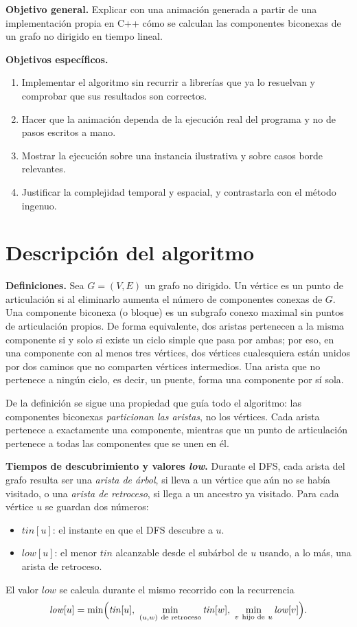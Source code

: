 \documentclass[11pt,a4paper]{article}
\numberwithin{equation}{section}
\newcommand{\tin}{\mathit{tin}}
\newcommand{\low}{\mathit{low}}
\begin{document}
\textbf{Objetivo general.} Explicar con una animación generada a partir de una implementación propia en C++ cómo se calculan las componentes biconexas de un grafo no dirigido en tiempo lineal.

\textbf{Objetivos específicos.}
\begin{enumerate}[label=\textbf{OE\arabic*.},leftmargin=3.2em]
\item Implementar el algoritmo sin recurrir a librerías que ya lo resuelvan y comprobar que sus resultados son correctos.
\item Hacer que la animación dependa de la ejecución real del programa y no de pasos escritos a mano.
\item Mostrar la ejecución sobre una instancia ilustrativa y sobre casos borde relevantes.
\item Justificar la complejidad temporal y espacial, y contrastarla con el método ingenuo.
\end{enumerate}

\section{Descripción del algoritmo}
\label{sec:algoritmo}
\textbf{Definiciones.} Sea $G=(V,E)$ un grafo no dirigido. Un vértice es un punto de articulación si al eliminarlo aumenta el número de componentes conexas de $G$. Una componente biconexa (o bloque) es un subgrafo conexo maximal sin puntos de articulación propios. De forma equivalente, dos aristas pertenecen a la misma componente si y solo si existe un ciclo simple que pasa por ambas; por eso, en una componente con al menos tres vértices, dos vértices cualesquiera están unidos por dos caminos que no comparten vértices intermedios. Una arista que no pertenece a ningún ciclo, es decir, un puente, forma una componente por sí sola.

De la definición se sigue una propiedad que guía todo el algoritmo: las componentes biconexas \emph{particionan las aristas}, no los vértices. Cada arista pertenece a exactamente una componente, mientras que un punto de articulación pertenece a todas las componentes que se unen en él.

\textbf{Tiempos de descubrimiento y valores \emph{low}.} Durante el DFS, cada arista del grafo resulta ser una \emph{arista de árbol}, si lleva a un vértice que aún no se había visitado, o una \emph{arista de retroceso}, si llega a un ancestro ya visitado. Para cada vértice $u$ se guardan dos números:
\begin{itemize}
\item $\tin[u]$: el instante en que el DFS descubre a $u$.
\item $\low[u]$: el menor $\tin$ alcanzable desde el subárbol de $u$ usando, a lo más, una arista de retroceso.
\end{itemize}
El valor $\low$ se calcula durante el mismo recorrido con la recurrencia
\begin{equation}
\low[u]=\min\Bigl(\tin[u],\ \min_{(u,w)\ \text{de retroceso}}\tin[w],\ \min_{v\ \text{hijo de}\ u}\low[v]\Bigr).
\label{eq:low}
\end{equation}
\end{document}
